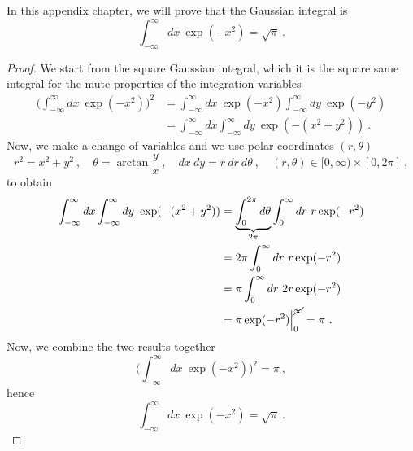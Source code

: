     In this appendix chapter, we will prove that the Gaussian integral is
    \begin{equation}\label{app:gauss}
        \int_{-\infty}^\infty dx ~ \exp(- x^2) = \sqrt{\pi} ~.
    \end{equation}
    \begin{proof}
        We start from the square Gaussian integral, which it is the square same integral for the mute properties of the integration variables 
        \begin{equation*}
        \begin{aligned}
            \Big (\int_{-\infty}^\infty dx ~ \exp(- x^2) \Big)^2 & = \int_{-\infty}^\infty dx ~ \exp(- x^2) \int_{-\infty}^\infty dy ~ \exp(- y^2) \\ & = \int_{-\infty}^\infty dx \int_{-\infty}^\infty dy ~ \exp(- (x^2 + y^2)) ~.
        \end{aligned}
        \end{equation*}
        Now, we make a change of variables and we use polar coordinates $(r, \theta)$
        \begin{equation*}
            r^2 = x^2 + y^2 ~, \quad \theta = \arctan \frac{y}{x} ~, \quad dx ~ dy = r ~ dr ~ d\theta ~, \quad (r, \theta) \in [0, \infty) \times [0, 2\pi] ~,
        \end{equation*} 
        to obtain
        \begin{equation*}
        \begin{aligned}
            \int_{-\infty}^\infty dx \int_{-\infty}^\infty dy ~ \exp(- (x^2 + y^2)) & = \underbrace{\int_0^{2\pi} d\theta}_{2\pi} \int_0^\infty dr ~ r \exp(- r^2) \\ & = 2 \pi \int_0^\infty dr ~ r \exp(- r^2) \\ & = \pi \int_0^\infty dr ~ 2 r \exp(- r^2) \\ & = \pi \exp(- r^2) \Big \vert_0^{\cancel \infty} = \pi ~.
        \end{aligned}
        \end{equation*}
        Now, we combine the two results together
        \begin{equation*}
            \Big (\int_{-\infty}^\infty dx ~ \exp(- x^2) \Big)^2 = \pi ~,
        \end{equation*}
        hence
        \begin{equation*}
            \int_{-\infty}^\infty dx ~ \exp(- x^2) = \sqrt{\pi} ~.
        \end{equation*}
    \end{proof}